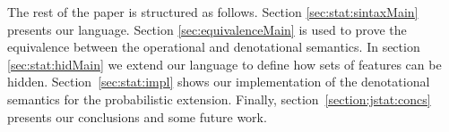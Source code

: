  

The rest of the paper is structured as follows. Section \ref{sec:stat:sintaxMain} presents our language. Section \ref{sec:equivalenceMain} is used to prove the equivalence between the operational and denotational semantics. In section \ref{sec:stat:hidMain} we extend our language to define how sets of features can be hidden. Section~\ref{sec:stat:impl} shows our implementation of the denotational semantics for the probabilistic extension. Finally, section~\ref{section:jstat:concs} presents our conclusions and some future work.





